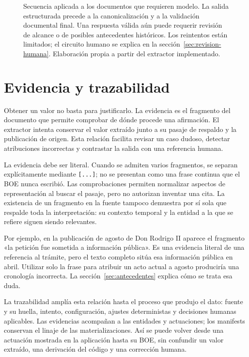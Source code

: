 \begin{figure}[p]
\centering

\caption[Extracción IA y validación]{Secuencia aplicada a los documentos
que requieren modelo. La salida estructurada precede a la canonicalización
y a la validación documental final. Una respuesta válida aún puede requerir
revisión de alcance o de posibles antecedentes históricos. Los reintentos están limitados;
el circuito humano se explica en la sección~\ref{sec:revision-humana}.
Elaboración propia a partir del extractor implementado.}
\label{fig:extraccion-validacion}
\end{figure}

\section{Evidencia y trazabilidad}
\label{sec:evidencia}
Obtener un valor no basta para justificarlo. La evidencia es el fragmento del
documento que permite comprobar de dónde procede una afirmación. El extractor
intenta conservar el valor extraído junto a su pasaje de respaldo y la
publicación de origen. Esta relación facilita revisar un caso dudoso, detectar
atribuciones incorrectas y contrastar la salida con una referencia humana.

La evidencia debe ser literal. Cuando se admiten varios fragmentos, se
separan explícitamente mediante \texttt{[...]}; no se presentan como una frase
continua que el BOE nunca escribió. Las comprobaciones permiten normalizar
aspectos de representación al buscar el pasaje, pero no autorizan inventar
una cita. La existencia de un fragmento en la fuente tampoco demuestra por
sí sola que respalde toda la interpretación: su contexto temporal y la
entidad a la que se refiere siguen siendo relevantes.

Por ejemplo, en la publicación de agosto de Don Rodrigo II aparece el
fragmento «la petición fue sometida a información pública». Es una evidencia
literal de una referencia al trámite, pero el texto completo sitúa esa
información pública en abril. Utilizar solo la frase para atribuir un acto
actual a agosto produciría una cronología incorrecta. La
sección~\ref{sec:antecedentes} explica cómo se trata esa duda.

La trazabilidad amplía esta relación hasta el proceso que produjo el dato:
fuente y su huella, intento, configuración, ajustes deterministas y decisiones
humanas aplicables. Las evidencias acompañan a las entidades y actuaciones;
los manifests conservan el linaje de las materializaciones. Así se puede
volver desde una actuación mostrada en la aplicación hasta su BOE, sin
confundir un valor extraído, una derivación del código y una corrección humana.


